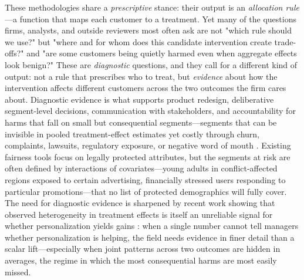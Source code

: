 \documentclass[11pt,letterpaper,english]{article}
\theoremstyle{definition}
\theoremstyle{definition}
\begin{document}
\begin{bibunit}
These methodologies share a \emph{prescriptive} stance: their output is an \emph{allocation rule}---a function that maps each customer to a treatment. Yet many of the questions firms, analysts, and outside reviewers most often ask are not "which rule should we use?" but "where and for whom does this candidate intervention create trade-offs?" and "are some customers being quietly harmed even when aggregate effects look benign?" These are \emph{diagnostic} questions, and they call for a different kind of output: not a rule that prescribes who to treat, but \emph{evidence} about how the intervention affects different customers across the two outcomes the firm cares about. Diagnostic evidence is what supports product redesign, deliberative segment-level decisions, communication with stakeholders, and accountability for harms that fall on small but consequential segments---segments that can be invisible in pooled treatment-effect estimates yet costly through churn, complaints, lawsuits, regulatory exposure, or negative word of mouth \citep{lambrecht2019algorithmic, ascarza2018retention}. Existing fairness tools focus on legally protected attributes, but the segments at risk are often defined by interactions of covariates---young adults in conflict-affected regions exposed to certain advertising, financially stressed users responding to particular promotions---that no list of protected demographics will fully cover. The need for diagnostic evidence is sharpened by recent work showing that observed heterogeneity in treatment effects is itself an unreliable signal for whether personalization yields gains \citep{shchetkina2024actionable}: when a single number cannot tell managers whether personalization is helping, the field needs evidence in finer detail than a scalar lift---especially when joint patterns across two outcomes are hidden in averages, the regime in which the most consequential harms are most easily missed.


\end{bibunit}
\end{document}
